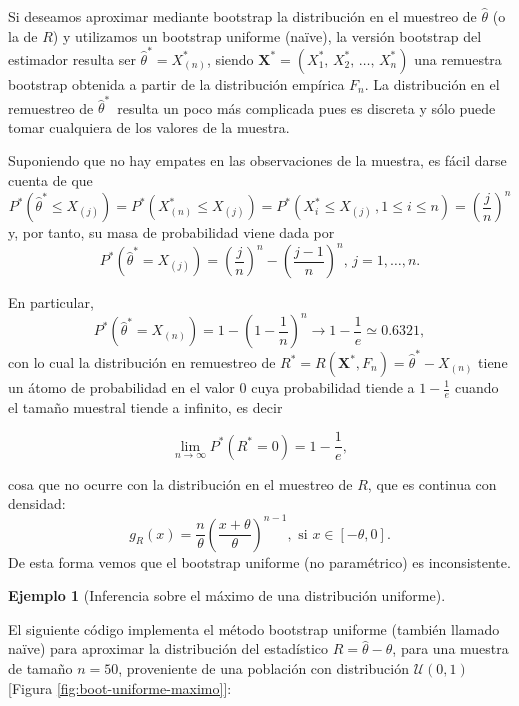 \documentclass[
]{book}
\theoremstyle{break}
\theoremstyle{definition}
\theoremstyle{definition}
\newtheorem{example}{Ejemplo}[chapter]
\theoremstyle{definition}
\theoremstyle{remark}
\begin{document}
Si deseamos aproximar mediante bootstrap la distribución en el muestreo
de \(\hat{\theta}\) (o la de \(R\)) y utilizamos un bootstrap uniforme
(naïve), la versión bootstrap del estimador resulta ser
\(\hat{\theta}^{\ast }=X_{(n)}^{\ast}\), siendo
\(\mathbf{X}^{\ast}=\left( X_1^{\ast}\text{, }X_2^{\ast}\text{, }\ldots \text{, }X_n^{\ast } \right)\) una remuestra bootstrap obtenida a partir de la distribución
empírica \(F_n\). La distribución en el remuestreo de \(\hat{\theta} ^{\ast}\,\) resulta un poco más complicada pues es discreta y sólo puede
tomar cualquiera de los valores de la muestra.

Suponiendo que no hay empates en las observaciones de la muestra, es
fácil darse cuenta de que
\[P^{\ast}\left( \hat{\theta}^{\ast}\leq X_{(j)} \right)
=P^{\ast}\left( X_{(n)}^{\ast}\leq X_{(j)
} \right) =P^{\ast}\left( X_i^{\ast}\leq X_{(j)}\,,
 1 \leq i \leq n \right) =\left( \frac{j}{n} \right)^{n}\]
y, por tanto, su masa de probabilidad viene dada por
\[P^{\ast}\left( \hat{\theta}^{\ast}=X_{(j)} \right) =\left( 
\frac{j}{n} \right)^{n}-\left( \frac{j-1}{n} \right)^{n}\text{, }j=1,\ldots,n.\]

En particular,
\[P^{\ast}\left( \hat{\theta}^{\ast}=X_{(n)} \right) =1-\left( 1-
\frac{1}{n} \right)^{n}\rightarrow 1-\frac{1}{e}\simeq 0.6321,\]
con lo cual la distribución en remuestreo de \(R^{\ast}=R\left( \mathbf{X}^{\ast},F_n \right) =\hat{\theta}^{\ast}-X_{\left( n \right)}\) tiene un átomo de probabilidad en el valor \(0\) cuya
probabilidad tiende a \(1-\frac{1}{e}\) cuando el tamaño muestral tiende a
infinito, es decir

\[\lim_{n\rightarrow \infty }P^{\ast}\left( R^{\ast}=0 \right) =1-\frac{1}{e},\]

cosa que no ocurre con la distribución en el muestreo de \(R\), que es continua
con densidad:
\[g_R\left( x \right) =\frac{n}{\theta }\left( \frac{x + \theta}{\theta } \right)^{n-1},
\text{ si }x\in \left[ -\theta, 0\right].\]
De esta forma vemos que el bootstrap uniforme (no paramétrico) es inconsistente.

\begin{example}[Inferencia sobre el máximo de una distribución uniforme]
\protect\hypertarget{exm:boot-maximo-uniforme}{}{\label{exm:boot-maximo-uniforme} \iffalse (Inferencia sobre el máximo de una distribución uniforme) \fi{} }
\end{example}

El siguiente código implementa el método
bootstrap uniforme (también llamado naïve) para aproximar la
distribución del estadístico \(R=\hat{\theta}-\theta\), para una muestra
de tamaño \(n=50\), proveniente de una población con distribución
\(\mathcal{U}\left( 0,1\right)\) {[}Figura \ref{fig:boot-uniforme-maximo}{]}:
\end{document}
